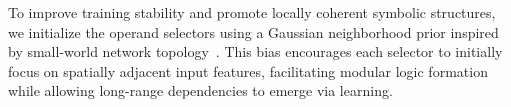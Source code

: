 To improve training stability and promote locally coherent symbolic structures, we initialize the operand selectors using a Gaussian neighborhood prior inspired by small-world network topology~\cite{watts1998collective, javaheripi2019swnet}. This bias encourages each selector to initially focus on spatially adjacent input features, facilitating modular logic formation while allowing long-range dependencies to emerge via learning.


    